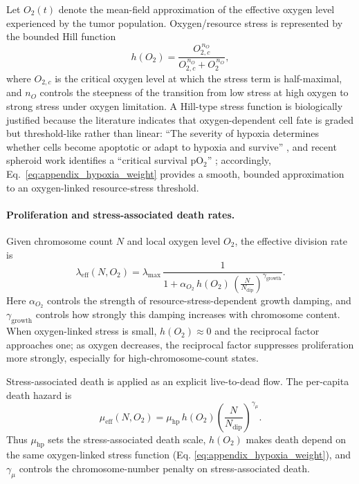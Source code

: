 \documentclass[11pt]{article}
\begin{document}
Let $O_2(t)$ denote the mean-field approximation of the effective oxygen level experienced by the tumor population. Oxygen/resource stress is represented by the bounded Hill function
\begin{equation}
h(O_2)=\frac{O_{2,c}^{\,n_O}}{O_{2,c}^{\,n_O}+O_2^{\,n_O}},
\label{eq:appendix_hypoxia_weight}
\end{equation}
where $O_{2,c}$ is the critical oxygen level at which the stress term is half-maximal, and $n_O$ controls the steepness of the transition from low stress at high oxygen to strong stress under oxygen limitation. A Hill-type stress function is biologically justified because the literature indicates that oxygen-dependent cell fate is graded but threshold-like rather than linear: ``The severity of hypoxia determines whether cells become apoptotic or adapt to hypoxia and survive'' \cite{greijer_role_2004}, and recent spheroid work identifies a ``critical survival pO$_2$'' \cite{shang_novel_2024}; accordingly, Eq.~\eqref{eq:appendix_hypoxia_weight} provides a smooth, bounded approximation to an oxygen-linked resource-stress threshold.

\paragraph{Proliferation and stress-associated death rates.}

Given chromosome count $N$ and local oxygen level $O_2$, the effective division rate is
\begin{equation}
\lambda_{\mathrm{eff}}(N,O_2)
=
\lambda_{\max}\,
\frac{1}{1+\alpha_{O_2}\,h(O_2)\,
\left(\frac{N}{N_{\mathrm{dip}}}\right)^{\gamma_{\mathrm{growth}}}}.
\label{eq:appendix_lambda_eff_soft}
\end{equation}
Here $\alpha_{O_2}$ controls the strength of resource-stress-dependent growth damping, and $\gamma_{\mathrm{growth}}$ controls how strongly this damping increases with chromosome content. When oxygen-linked stress is small, $h(O_2)\approx 0$ and the reciprocal factor approaches one; as oxygen decreases, the reciprocal factor suppresses proliferation more strongly, especially for high-chromosome-count states.

Stress-associated death is applied as an explicit live-to-dead flow. The per-capita death hazard is
\begin{equation}
\mu_{\mathrm{eff}}(N,O_2)
=
\mu_{\mathrm{hp}}\,
h(O_2)
\left(\frac{N}{N_{\mathrm{dip}}}\right)^{\gamma_\mu}.
\label{eq:appendix_mu_soft}
\end{equation}
Thus $\mu_{\mathrm{hp}}$ sets the stress-associated death scale, $h(O_2)$ makes death depend on the same oxygen-linked stress function (Eq. \eqref{eq:appendix_hypoxia_weight}), and $\gamma_\mu$ controls the chromosome-number penalty on stress-associated death.
\end{document}
